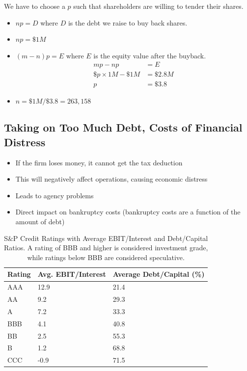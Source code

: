 We have to choose a $p$ such that shareholders are willing to tender their shares.

\begin{itemize}
    \item $np = D$ where $D$ is the debt we raise to buy back shares.
    \item $np = \$1M$
    \item $(m-n)p = E$ where $E$ is the equity value after the buyback.
    \begin{align*}
        mp - np &= E \\
        \$p \times 1M - \$1M &= \$2.8M \\
        p &= \$3.8
    \end{align*}
    \item $n = \$1M/\$3.8 = 263,158$
\end{itemize}

\subsection*{Taking on Too Much Debt, Costs of Financial Distress}
\begin{itemize}
    \item If the firm loses money, it cannot get the tax deduction
    \item This will negatively affect operations, causing economic distress
    \item Leads to agency problems
    \item Direct impact on bankruptcy costs (bankruptcy costs are a function of the amount of debt)
\end{itemize}

\begin{table}[h]
    \centering
    \caption{S\&P Credit Ratings with Average EBIT/Interest and Debt/Capital Ratios. A rating of BBB and higher is considered investment grade, while ratings below BBB are considered speculative.}
    \label{tab:credit_ratings}
    \begin{tabular}{lll}
    \toprule
    \textbf{Rating} & \textbf{Avg. EBIT/Interest} & \textbf{Average Debt/Capital (\%)} \\
    \midrule
    AAA & 12.9 & 21.4 \\
    AA  & 9.2  & 29.3 \\
    A   & 7.2  & 33.3 \\
    BBB & 4.1  & 40.8 \\
    \midrule
    \addlinespace 
    BB  & 2.5  & 55.3 \\
    B   & 1.2  & 68.8 \\
    CCC & -0.9 & 71.5 \\
    \bottomrule
    \end{tabular}
\end{table}

